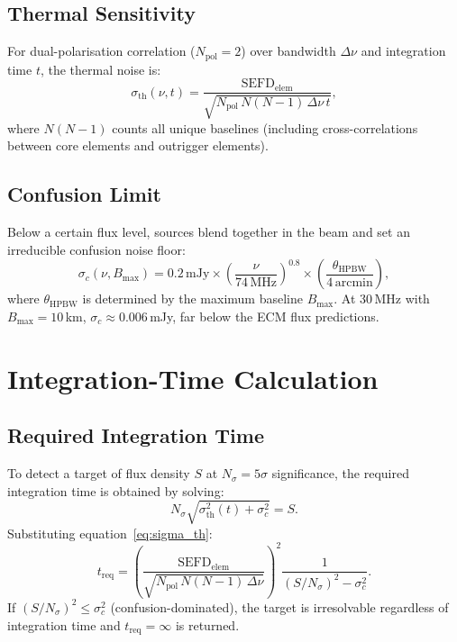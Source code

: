 \documentclass[12pt,a4paper]{article}
\begin{document}
\subsection{Thermal Sensitivity}

For dual-polarisation correlation ($N_\mathrm{pol} = 2$) over bandwidth
$\Delta\nu$ and integration time $t$, the thermal noise is:
\begin{equation}
  \sigma_\mathrm{th}(\nu, t) = \frac{\mathrm{SEFD}_\mathrm{elem}}
    {\sqrt{N_\mathrm{pol}\,N(N-1)\,\Delta\nu\,t}},
  \label{eq:sigma_th}
\end{equation}
where $N(N-1)$ counts all unique baselines (including cross-correlations
between core elements and outrigger elements).

\subsection{Confusion Limit}

Below a certain flux level, sources blend together in the beam and set an
irreducible confusion noise floor:
\begin{equation}
  \sigma_c(\nu, B_\mathrm{max}) = 0.2\,\mathrm{mJy} \times
    \left(\frac{\nu}{74\,\mathrm{MHz}}\right)^{0.8} \times
    \left(\frac{\theta_\mathrm{HPBW}}{4\,\mathrm{arcmin}}\right),
  \label{eq:confusion}
\end{equation}
where $\theta_\mathrm{HPBW}$ is determined by the maximum baseline
$B_\mathrm{max}$.
At 30\,MHz with $B_\mathrm{max} = 10$\,km, $\sigma_c \approx 0.006$\,mJy,
far below the ECM flux predictions.

\section{Integration-Time Calculation}
\label{sec:tint}

\subsection{Required Integration Time}

To detect a target of flux density $S$ at $N_\sigma = 5\sigma$ significance,
the required integration time is obtained by solving:
\begin{equation}
  N_\sigma \sqrt{\sigma_\mathrm{th}^2(t) + \sigma_c^2} = S.
  \label{eq:detection_condition}
\end{equation}
Substituting equation~\eqref{eq:sigma_th}:
\begin{equation}
  t_\mathrm{req} = \left(\frac{\mathrm{SEFD}_\mathrm{elem}}
    {\sqrt{N_\mathrm{pol}\,N(N-1)\,\Delta\nu}}\right)^2
    \frac{1}{(S/N_\sigma)^2 - \sigma_c^2}.
  \label{eq:t_req}
\end{equation}
If $(S/N_\sigma)^2 \le \sigma_c^2$ (confusion-dominated), the target is
irresolvable regardless of integration time and $t_\mathrm{req} = \infty$ is
returned.
\end{document}
